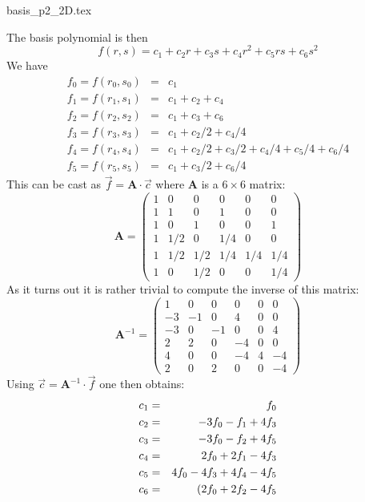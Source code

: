\begin{flushright} {\tiny {\color{gray} basis\_p2\_2D.tex}} \end{flushright}



The basis polynomial is then
\[
f(r,s) = c_1 + c_2 r + c_3 s + c_4  r^2 + c_5 rs  + c_6 s^2
\]
We have 
\begin{eqnarray}
f_0 = f(r_0,s_0) &=& c_1 \nonumber\\
f_1 = f(r_1,s_1) &=& c_1 + c_2 + c_4\nonumber\\
f_2 = f(r_2,s_2) &=& c_1 + c_3 + c_6\nonumber\\
f_3 = f(r_3,s_3) &=& c_1 + c_2/2 + c_4/4\nonumber\\
f_4 = f(r_4,s_4) &=& c_1 + c_2/2 + c_3/2  + c_4/4 + c_5/4 + c_6/4\nonumber\\
f_5 = f(r_5,s_5) &=& c_1 + c_3/2 + c_6/4\nonumber
\end{eqnarray}
This can be cast as $\vec{f}={\bm A}\cdot \vec{c}$ where ${\bm A}$ is a $6\times6$ matrix:
\[
{\bm A}=
\left(
\begin{array}{cccccc}
1&0   &  0  & 0   & 0   & 0\\
1&1   &  0  & 1   & 0   & 0\\
1&0   &  1  & 0   & 0   & 1\\
1&1/2 &  0  & 1/4 & 0   & 0\\
1&1/2 &  1/2& 1/4 & 1/4 & 1/4\\
1&0   &  1/2& 0   & 0   & 1/4
\end{array}
\right)
\]
As it turns out it is rather trivial to compute the inverse of this matrix:
\[
{\bm A}^{-1}=
\left(
\begin{array}{cccccc}
1  & 0 & 0  & 0  & 0 & 0  \\
-3 & -1& 0  & 4  & 0 & 0 \\
-3 & 0 & -1 & 0  & 0 & 4 \\
2  & 2 & 0  & -4 & 0 & 0  \\
4  & 0 & 0  & -4 & 4 & -4 \\
2  & 0 & 2  & 0  & 0 & -4
\end{array}
\right)
\]
Using $\vec{c}={\bm A}^{-1}\cdot \vec{f}$ one then obtains:
\begin{eqnarray}
c_1 &=& f_0 \nonumber\\
c_2 &=& -3f_0-f_1+4f_3\nonumber\\
c_3 &=& -3f_0-f_2+4f_5  \nonumber\\
c_4 &=& 2f_0+2f_1-4f_3 \nonumber\\
c_5 &=& 4f_0-4f_3+4f_4-4f_5 \nonumber\\
c_6 &=& (2f_0+2f_2-4f_5 \nonumber
\end{eqnarray}
